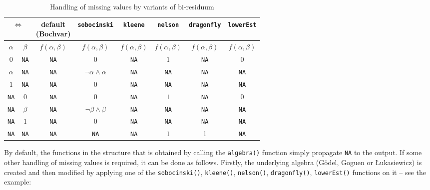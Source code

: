 \documentclass[review]{elsarticle}
\newcommand{\code}[1]{\texttt{#1}}
\begin{document}
\begin{table}
    \centering
    \caption{Handling of missing values by variants of bi-residuum}
    \label{tab:equivalences}
    \begin{tabular}{cc|cccccc}
        \multicolumn{2}{c|}{$\Leftrightarrow$} & \makecell{default \\ (Bochvar)} & \texttt{sobocinski} & \texttt{kleene} & \texttt{nelson} & \texttt{dragonfly} & \texttt{lowerEst} \\
        \hline
        $\alpha$    & $\beta$     & $f(\alpha, \beta)$ & $f(\alpha, \beta)$ & $f(\alpha, \beta)$ & $f(\alpha, \beta)$ & $f(\alpha, \beta)$ & $f(\alpha, \beta)$ \\
        $0$         & \code{NA} & \code{NA} & $0$         & \code{NA} & $1$         & \code{NA} & 0 \\
        $\alpha$    & \code{NA} & \code{NA} & $\neg \alpha \wedge \alpha$         & \code{NA} & \code{NA} & \code{NA} & \code{NA} \\
        $1$         & \code{NA} & \code{NA} & $0$         & \code{NA} & \code{NA} & \code{NA} & \code{NA} \\
        \code{NA} & $0$         & \code{NA} & $0$         & \code{NA} & $1$         & \code{NA} & 0 \\
        \code{NA} & $\beta$     & \code{NA} & $\neg \beta \wedge \beta$         & \code{NA} & \code{NA} & \code{NA} & \code{NA} \\
        \code{NA} & $1$         & \code{NA} & $0$         & \code{NA} & \code{NA} & \code{NA} & \code{NA} \\
        \code{NA} & \code{NA} & \code{NA} & \code{NA} & \code{NA} & $1$ & 1 & \code{NA} 
    \end{tabular}
\end{table}



By default, the functions in the structure that is obtained by calling the \code{algebra()} function simply propagate \code{NA} to the output. If some other handling of missing values is required, it can be done as follows. Firstly, the underlying algebra (G\"odel, Goguen or \L{}ukasiewicz) is created and then modified by applying one of the \code{sobocinski()}, \code{kleene()}, \code{nelson()}, \code{dragonfly()}, \code{lowerEst()} functions on it -- see the example:
%




\end{document}
